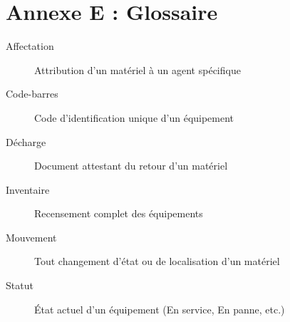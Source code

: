 \section{Annexe E : Glossaire}

\begin{description}
    \item[Affectation] Attribution d'un matériel à un agent spécifique
    \item[Code-barres] Code d'identification unique d'un équipement
    \item[Décharge] Document attestant du retour d'un matériel
    \item[Inventaire] Recensement complet des équipements
    \item[Mouvement] Tout changement d'état ou de localisation d'un matériel
    \item[Statut] État actuel d'un équipement (En service, En panne, etc.)
\end{description}


